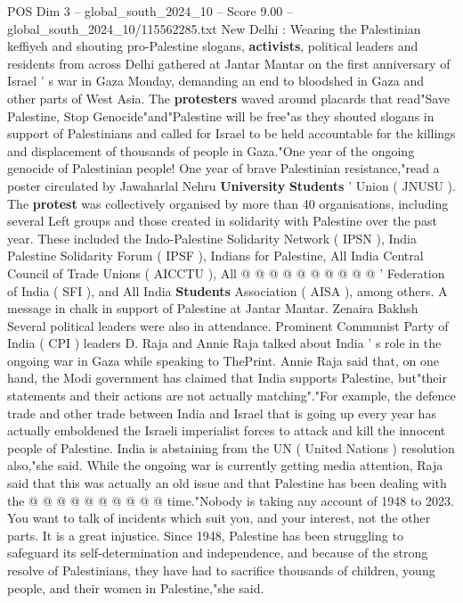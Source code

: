 \begin{textsample}{POS Dim 3 – global\_south\_2024\_10 – Score 9.00 – global\_south\_2024\_10/115562285.txt}  \label{ex:f3_pos_364}
New Delhi : Wearing the Palestinian keffiyeh and shouting pro-Palestine slogans, \textbf{activists}, political leaders and residents from across Delhi gathered at Jantar Mantar on the first anniversary of Israel ' s war in Gaza Monday, demanding an end to bloodshed in Gaza and other parts of West Asia.
The \textbf{protesters} waved around placards that read"Save Palestine, Stop Genocide"and"Palestine will be free"as they shouted slogans in support of Palestinians and called for Israel to be held accountable for the killings and displacement of thousands of people in Gaza."One year of the ongoing genocide of Palestinian people!
One year of brave Palestinian resistance,"read a poster circulated by Jawaharlal Nehru \textbf{University} \textbf{Students} ' Union ( JNUSU ).
The \textbf{protest} was collectively organised by more than 40 organisations, including several Left groups and those created in solidarity with Palestine over the past year.
These included the Indo-Palestine Solidarity Network ( IPSN ), India Palestine Solidarity Forum ( IPSF ), Indians for Palestine, All India Central Council of Trade Unions ( AICCTU ), All @ @ @ @ @ @ @ @ @ @ ' Federation of India ( SFI ), and All India \textbf{Students} Association ( AISA ), among others.
A message in chalk in support of Palestine at Jantar Mantar.
Zenaira Bakhsh Several political leaders were also in attendance.
Prominent Communist Party of India ( CPI ) leaders D.
Raja and Annie Raja talked about India ' s role in the ongoing war in Gaza while speaking to ThePrint.
Annie Raja said that, on one hand, the Modi government has claimed that India supports Palestine, but"their statements and their actions are not actually matching"."For example, the defence trade and other trade between India and Israel that is going up every year has actually emboldened the Israeli imperialist forces to attack and kill the innocent people of Palestine.
India is abstaining from the UN ( United Nations ) resolution also,"she said.
While the ongoing war is currently getting media attention, Raja said that this was actually an old issue and that Palestine has been dealing with the @ @ @ @ @ @ @ @ @ @ time."Nobody is taking any account of 1948 to 2023.
You want to talk of incidents which suit you, and your interest, not the other parts.
It is a great injustice.
Since 1948, Palestine has been struggling to safeguard its self-determination and independence, and because of the strong resolve of Palestinians, they have had to sacrifice thousands of children, young people, and their women in Palestine,"she said.

\end{textsample}
